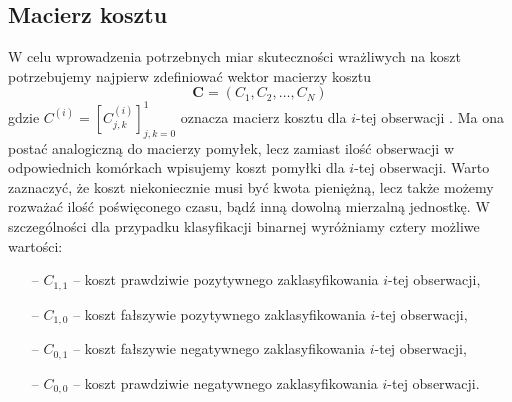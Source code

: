 \documentclass[inzynierska]{pwr_wmat_praca_dyplomowa}
\theoremstyle{plain}
\numberwithin{theorem}{chapter}
\theoremstyle{definition}
\numberwithin{theorem}{chapter}
\begin{document}
\subsection{Macierz kosztu}
\label{sec:macierz-kosztu}
W celu wprowadzenia potrzebnych miar skuteczności wrażliwych na koszt potrzebujemy najpierw zdefiniować wektor macierzy kosztu
$$ \boldsymbol{C} = (C_1, C_2, \dots, C_N) $$
gdzie $ C^{(i)} = [C^{(i)}_{j,k}]_{j,k=0}^1 $ oznacza macierz kosztu dla $i$-tej obserwacji \cite{CSCCFD, CS-Learning}. Ma ona postać analogiczną do macierzy pomyłek, lecz zamiast ilość obserwacji w odpowiednich komórkach wpisujemy koszt pomyłki dla $i$-tej obserwacji. Warto zaznaczyć, że koszt niekoniecznie musi być kwota pieniężną, lecz także możemy rozważać ilość poświęconego czasu, bądź inną dowolną mierzalną jednostkę. W szczególności dla przypadku klasyfikacji binarnej wyróżniamy cztery możliwe wartości:
\begin{itemize}
	\item[--] $C_{1,1}$ -- koszt prawdziwie pozytywnego zaklasyfikowania $i$-tej obserwacji,
	\item[--] $C_{1,0}$ -- koszt fałszywie pozytywnego zaklasyfikowania $i$-tej obserwacji,
	\item[--] $C_{0,1}$ -- koszt fałszywie negatywnego zaklasyfikowania $i$-tej obserwacji,
	\item[--] $C_{0,0}$ -- koszt prawdziwie negatywnego zaklasyfikowania $i$-tej obserwacji.
\end{itemize}
\end{document}
